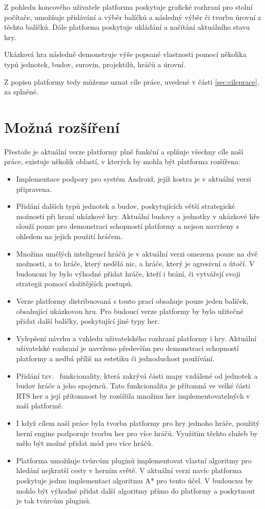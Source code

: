 Z pohledu koncového uživatele platforma poskytuje grafické rozhraní pro stolní počítače, umožňuje přidávání a výběr balíčků a následný výběr či tvorbu úrovní z těchto balíčků. Dále platforma poskytuje ukládání a načítání aktuálního stavu hry.

Ukázková hra následně demonstruje výše popsané vlastnosti pomocí několika typů jednotek, budov, surovin, projektilů, hráčů a úrovní.


Z popisu platformy tedy můžeme uznat cíle práce, uvedené v části \ref{sec:cileprace}, za splněné.

\section{Možná rozšíření}
Přestože je aktuální verze platformy plně funkční a splňuje všechny cíle naší práce, existuje několik oblastí, v kterých by mohla být platforma rozšířena:

\begin{itemize}
	\item Implementace podpory pro systém Android, jejíž kostra je v aktuální verzi připravena.
	\item Přidání dalších typů jednotek a budov, poskytujících větší strategické možnosti při hraní ukázkové hry. Aktuální budovy a jednotky v ukázkové hře slouží pouze pro demonstraci schopností platformy a nejsou navrženy s ohledem na jejich použití hráčem.
	\item Množina umělých inteligencí hráčů je v aktuální verzi omezena pouze na dvě možnosti, a to hráče, který nedělá nic, a hráče, který je agresivní a útočí. V budoucnu by bylo výhodné přidat hráče, kteří i brání, či vytvářejí svoji strategii pomocí složitějších postupů.
	\item Verze platformy distribuovaná s touto prací obsahuje pouze jeden balíček, obsahující ukázkovou hru. Pro budoucí verze platformy by bylo užitečné přidat další balíčky, poskytující jiné typy her.
	\item Vylepšení návrhu a vzhledu uživatelského rozhraní platformy i hry. Aktuální uživatelské rozhraní je navrženo především pro demonstraci schopností platformy a nedbá příliš na estetiku či jednoduchost používání. 
	\item Přidání tzv.~ funkcionality, která zakrývá části mapy vzdálené od jednotek a budov hráče a jeho spojenců. Tato funkcionalita je přítomná ve velké části RTS her a její přítomnost by rozšířila množinu her implementovatelných v naší platformě.
	\item I když cílem naší práce byla tvorba platformy pro hry jednoho hráče, použitý herní engine podporuje tvorbu her pro více hráčů. Využitím těchto služeb by mělo být možné přidat mód pro více hráčů.
	\item Platforma umožňuje tvůrcům pluginů implementovat vlastní algoritmy pro hledání nejkratší cesty v herním světě. V aktuální verzi navíc platforma poskytuje jednu implementaci algoritmu A* pro tento účel. V budoucnu by mohlo být výhodné přidat další algoritmy přímo do platformy a poskytnout je tak tvůrcům pluginů.
	
\end{itemize}
